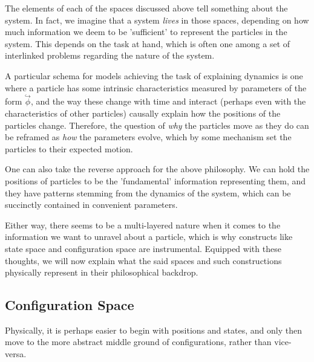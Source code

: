 \documentclass[oneside]{book}
\newcommand{\hook}{\overset{\hookrightarrow}}
\begin{document}
The elements of each of the spaces discussed above tell something about the system. In fact, we imagine that a system \emph{lives} in those spaces, depending on how much information we deem to be 'sufficient' to represent the particles in the system. This depends on the task at hand, which is often one among a set of interlinked problems regarding the nature of the system. 


A particular schema for models achieving the task of explaining dynamics is one where a particle has some intrinsic characteristics measured by parameters of the form $\hook{\phi}$, and the way these change with time and interact (perhaps even with the characteristics of other particles) causally explain how the positions of the particles change. Therefore, the question of \emph{why} the particles move as they do can be reframed as \emph{how} the parameters evolve, which by some mechanism set the particles to their expected motion.

One can also take the reverse approach for the above philosophy. We can hold the positions of particles to be the 'fundamental' information representing them, and they have patterns stemming from the dynamics of the system, which can be succinctly contained in convenient parameters.

Either way, there seems to be a multi-layered nature when it comes to the information we want to unravel about a particle, which is why constructs like state space and configuration space are instrumental. Equipped with these thoughts, we will now explain what the said spaces and such constructions physically represent in their philosophical backdrop.

\subsection{Configuration Space}
\label{configuration_space}

Physically, it is perhaps easier to begin with positions and states, and only then move to the more abstract middle ground of configurations, rather than vice-versa.
\end{document}
